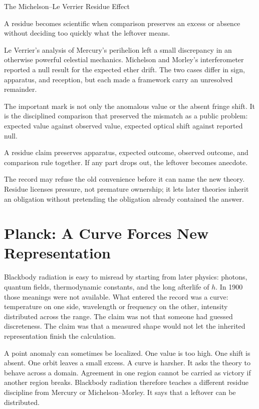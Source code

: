 \begin{phenom}{The Michelson--Le Verrier Residue Effect~\cite{leverrier1859,michelson1887}}
\label{ph:michelson-leverrier-residue}

\PhStatement
A residue becomes scientific when comparison preserves an excess or absence
without deciding too quickly what the leftover means.

\PhOrigin
Le Verrier's analysis of Mercury's perihelion left a small discrepancy in an
otherwise powerful celestial mechanics. Michelson and Morley's interferometer
reported a null result for the expected ether drift. The two cases differ in
sign, apparatus, and reception, but each made a framework carry an unresolved
remainder.

\PhObservation
The important mark is not only the anomalous value or the absent fringe shift.
It is the disciplined comparison that preserved the mismatch as a public
problem: expected value against observed value, expected optical shift against
reported null.

\PhConstraint
A residue claim preserves apparatus, expected outcome, observed outcome,
and comparison rule together. If any part drops out, the leftover becomes
anecdote.

\PhConsequence
The record may refuse the old convenience before it can name the new theory.
Residue licenses pressure, not premature ownership; it lets later theories
inherit an obligation without pretending the obligation already contained the
answer.
\end{phenom}

\section{Planck: A Curve Forces New Representation}

Blackbody radiation is easy to misread by starting from later physics:
photons, quantum fields, thermodynamic constants, and the long afterlife
of $h$. In 1900 those meanings were not available. What entered the record
was a curve: temperature on one side, wavelength or
frequency on the other, intensity distributed across the range. The claim
was not that someone had guessed discreteness. The claim was that a
measured shape would not let the inherited representation finish the
calculation.

A point anomaly can sometimes be localized. One value is too high. One
shift is absent. One orbit leaves a small excess. A curve is harsher. It
asks the theory to behave across a domain. Agreement in one region cannot
be carried as victory if another region breaks. Blackbody radiation
therefore teaches a different residue discipline from Mercury or
Michelson--Morley. It says that a leftover can be distributed.

